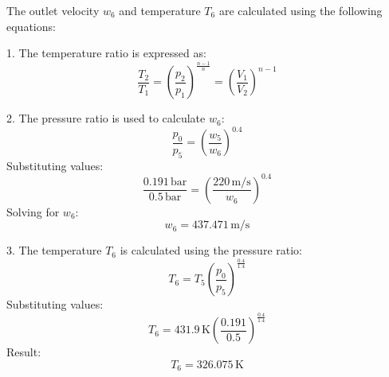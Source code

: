 The outlet velocity \( w_6 \) and temperature \( T_6 \) are calculated using the following equations:  

1. The temperature ratio is expressed as:  
\[
\frac{T_2}{T_1} = \left( \frac{p_2}{p_1} \right)^{\frac{n-1}{n}} = \left( \frac{V_1}{V_2} \right)^{n-1}
\]  

2. The pressure ratio is used to calculate \( w_6 \):  
\[
\frac{p_0}{p_5} = \left( \frac{w_5}{w_6} \right)^{0.4}
\]  
Substituting values:  
\[
\frac{0.191 \, \text{bar}}{0.5 \, \text{bar}} = \left( \frac{220 \, \text{m/s}}{w_6} \right)^{0.4}
\]  
Solving for \( w_6 \):  
\[
w_6 = 437.471 \, \text{m/s}
\]  

3. The temperature \( T_6 \) is calculated using the pressure ratio:  
\[
T_6 = T_5 \left( \frac{p_0}{p_5} \right)^{\frac{0.4}{1.4}}
\]  
Substituting values:  
\[
T_6 = 431.9 \, \text{K} \left( \frac{0.191}{0.5} \right)^{\frac{0.4}{1.4}}
\]  
Result:  
\[
T_6 = 326.075 \, \text{K}
\]